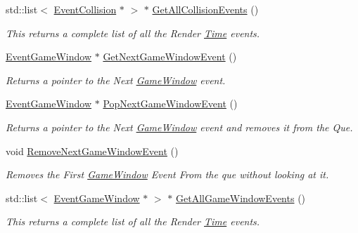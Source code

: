 \begin{DoxyCompactItemize}
std::list$<$ \hyperlink{classphys_1_1EventCollision}{EventCollision} $\ast$ $>$ $\ast$ \hyperlink{classphys_1_1EventManager_a1881421e075a5965d6d5a0678f93ad9a}{GetAllCollisionEvents} ()
\begin{DoxyCompactList}\small\item\em This returns a complete list of all the Render \hyperlink{structphys_1_1Time}{Time} events. \item\end{DoxyCompactList}\item 
\hyperlink{classphys_1_1EventGameWindow}{EventGameWindow} $\ast$ \hyperlink{classphys_1_1EventManager_aead881349edba3f0bcca34eaae41a8ee}{GetNextGameWindowEvent} ()
\begin{DoxyCompactList}\small\item\em Returns a pointer to the Next \hyperlink{classphys_1_1GameWindow}{GameWindow} event. \item\end{DoxyCompactList}\item 
\hyperlink{classphys_1_1EventGameWindow}{EventGameWindow} $\ast$ \hyperlink{classphys_1_1EventManager_abc62c29549957c314a8784eac4fb16ad}{PopNextGameWindowEvent} ()
\begin{DoxyCompactList}\small\item\em Returns a pointer to the Next \hyperlink{classphys_1_1GameWindow}{GameWindow} event and removes it from the Que. \item\end{DoxyCompactList}\item 
void \hyperlink{classphys_1_1EventManager_a8172d685143bf18d0e48810fac25860e}{RemoveNextGameWindowEvent} ()
\begin{DoxyCompactList}\small\item\em Removes the First \hyperlink{classphys_1_1GameWindow}{GameWindow} Event From the que without looking at it. \item\end{DoxyCompactList}\item 
std::list$<$ \hyperlink{classphys_1_1EventGameWindow}{EventGameWindow} $\ast$ $>$ $\ast$ \hyperlink{classphys_1_1EventManager_aacdd185f6334f1258d0d7022bae3932d}{GetAllGameWindowEvents} ()
\begin{DoxyCompactList}\small\item\em This returns a complete list of all the Render \hyperlink{structphys_1_1Time}{Time} events. \item\end{DoxyCompactList}\item 

\end{DoxyCompactItemize}
